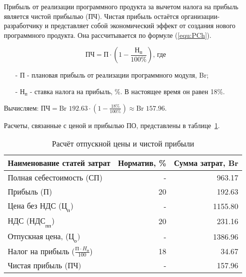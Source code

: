 Прибыль от реализации программного продукта за вычетом налога на прибыль является чистой прибылью ($\text{ПЧ}$).
Чистая прибыль остаётся организации-разработчику и представляет собой экономический эффект от создания нового программного продукта.
Она рассчитывается по формуле (\ref{equ:PCh}).

\begin{equation}
    \label{equ:PCh}
    \text{ПЧ} = \text{П} \cdot ( 1 - \frac{ \text{Н}_\text{п} }{ 100\% }) \text{, где}
\end{equation}

\begin{enumerate}
    \item[-] $\text{П}$ - плановая прибыль от реализации программного модуля, Br;
    \item[-] $\text{Н}_\text{п}$ - ставка налога на прибыль, \%. В настоящее время он равен 18\%.
\end{enumerate}

Вычисляем: $\text{ПЧ} = \text{Br }192.63 \cdot ( 1 - \frac{ 18\% }{ 100\% }) \approx \text{Br }157.96$.

Расчеты, связанные с ценой и прибылью ПО, представлены в таблице~\ref{tab:RaschetOtpusknoiCeniIChistoiPribiliPO}.

\begin{table}[ht]
    \centering

    \caption{Расчёт отпускной цены и чистой прибыли}
    \label{tab:RaschetOtpusknoiCeniIChistoiPribiliPO}

    \begin{tabular}{|l|r|r|}
        \hline
        \multicolumn{1}{|c|}{ \textbf{Наименование статей затрат} }
        & \multicolumn{1}{c|}{ \textbf{Норматив, \%} }
        & \multicolumn{1}{c|}{ \textbf{Сумма затрат, Br} }
        \\ \hline

        Полная себестоимость ($\text{СП}$) & - & 963.17 \\ \hline
        Прибыль ($\text{П}$) & 20 & 192.63 \\ \hline
        Цена без НДС ($\text{Ц}_\text{п}$) & - & 1155.80 \\ \hline
        НДС ($\text{НДС}_\text{пп}$) & 20 & 231.16\\ \hline
        Отпускная цена, ($\text{Ц}_\text{о})$ & - & 1386.96 \\ \hline
        Налог на прибыль ($\frac{ \text{П} \cdot H_\text{п} }{ 100 }$) & 18 & 34.67 \\ \hline
        Чистая прибыль ($\text{ПЧ})$ & - & 157.96 \\ \hline
    \end{tabular}
\end{table}

